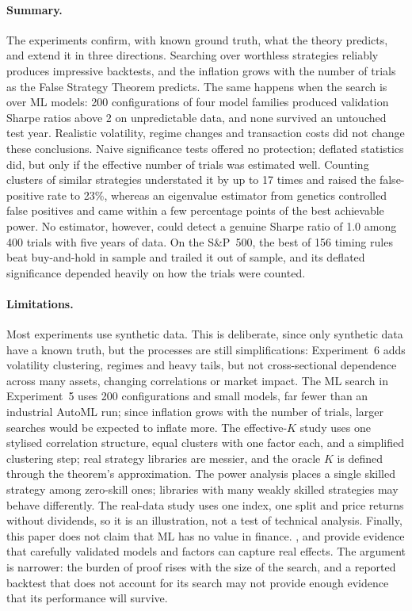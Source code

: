 \documentclass[11pt]{article}
\begin{document}
\paragraph{Summary.} The experiments confirm, with known ground truth, what the theory predicts, and extend it in three directions. Searching over worthless strategies reliably produces impressive backtests, and the inflation grows with the number of trials as the False Strategy Theorem predicts. The same happens when the search is over ML models: 200 configurations of four model families produced validation Sharpe ratios above 2 on unpredictable data, and none survived an untouched test year. Realistic volatility, regime changes and transaction costs did not change these conclusions. Naive significance tests offered no protection; deflated statistics did, but only if the effective number of trials was estimated well. Counting clusters of similar strategies understated it by up to 17 times and raised the false-positive rate to 23\%, whereas an eigenvalue estimator from genetics controlled false positives and came within a few percentage points of the best achievable power. No estimator, however, could detect a genuine Sharpe ratio of 1.0 among 400 trials with five years of data. On the S\&P~500, the best of 156 timing rules beat buy-and-hold in sample and trailed it out of sample, and its deflated significance depended heavily on how the trials were counted.

\paragraph{Limitations.} Most experiments use synthetic data. This is deliberate, since only synthetic data have a known truth, but the processes are still simplifications: Experiment~6 adds volatility clustering, regimes and heavy tails, but not cross-sectional dependence across many assets, changing correlations or market impact. The ML search in Experiment~5 uses 200 configurations and small models, far fewer than an industrial AutoML run; since inflation grows with the number of trials, larger searches would be expected to inflate more. The effective-$K$ study uses one stylised correlation structure, equal clusters with one factor each, and a simplified clustering step; real strategy libraries are messier, and the oracle $K$ is defined through the theorem's approximation. The power analysis places a single skilled strategy among zero-skill ones; libraries with many weakly skilled strategies may behave differently. The real-data study uses one index, one split and price returns without dividends, so it is an illustration, not a test of technical analysis. Finally, this paper does not claim that ML has no value in finance. \citet{gu2020}, \citet{kelly2024} and \citet{jensen2023} provide evidence that carefully validated models and factors can capture real effects. The argument is narrower: the burden of proof rises with the size of the search, and a reported backtest that does not account for its search may not provide enough evidence that its performance will survive.
\end{document}
